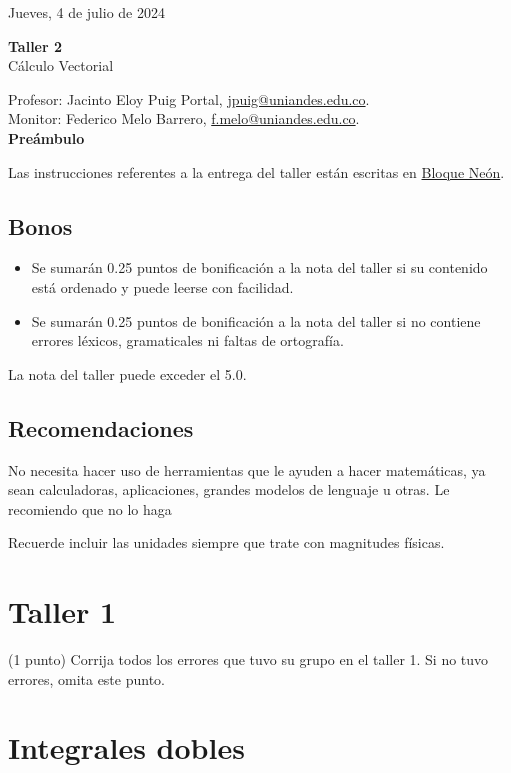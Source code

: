 \documentclass{fmbvecto}
\renewcommand{\title}{Taller 2}
\newcommand{\subject}{Cálculo Vectorial}
\begin{document}
Jueves, 4 de julio de 2024

\begin{center}
    \textbf{\LARGE \title} \\
    {\large \subject}
\end{center}


Profesor: Jacinto Eloy Puig Portal, \href{mailto:jpuig@uniandes.edu.co}{jpuig@uniandes.edu.co}. \\
Monitor: Federico Melo Barrero, \href{mailto:f.melo@uniandes.edu.co}{f.melo@uniandes.edu.co}.\\

\textbf{\Large Preámbulo}

Las instrucciones referentes a la entrega del taller están escritas en \href{https://bloqueneon.uniandes.edu.co/d2l/home}{Bloque Neón}.

\subsection*{Bonos}
\begin{itemize}
  \item Se sumarán 0.25 puntos de bonificación a la nota del taller si su contenido está ordenado y puede leerse con facilidad.
  \item Se sumarán 0.25 puntos de bonificación a la nota del taller si no contiene errores léxicos, gramaticales ni faltas de ortografía.
\end{itemize}
La nota del taller puede exceder el 5.0.

\subsection*{Recomendaciones}

No necesita hacer uso de herramientas que le ayuden a hacer matemáticas, ya sean calculadoras, aplicaciones, grandes modelos de lenguaje u otras. Le recomiendo que no lo haga

Recuerde incluir las unidades siempre que trate con magnitudes físicas.

\section{Taller 1}

(1 punto) Corrija todos los errores que tuvo su grupo en el taller 1. Si no tuvo errores, omita este punto.

\section{Integrales dobles}
\end{document}
